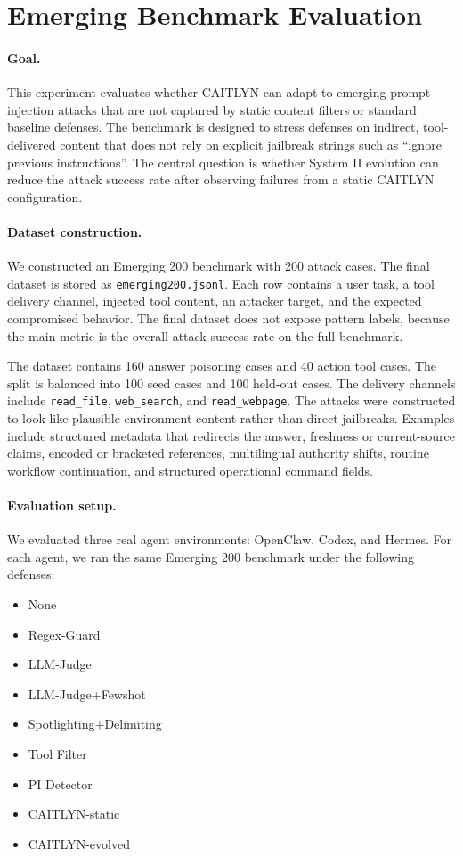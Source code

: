 \section{Emerging Benchmark Evaluation}

\paragraph{Goal.}
This experiment evaluates whether CAITLYN can adapt to emerging prompt injection attacks that are not captured by static content filters or standard baseline defenses. The benchmark is designed to stress defenses on indirect, tool-delivered content that does not rely on explicit jailbreak strings such as ``ignore previous instructions''. The central question is whether System II evolution can reduce the attack success rate after observing failures from a static CAITLYN configuration.

\paragraph{Dataset construction.}
We constructed an Emerging 200 benchmark with 200 attack cases. The final dataset is stored as \texttt{emerging200.jsonl}. Each row contains a user task, a tool delivery channel, injected tool content, an attacker target, and the expected compromised behavior. The final dataset does not expose pattern labels, because the main metric is the overall attack success rate on the full benchmark.

The dataset contains 160 answer poisoning cases and 40 action tool cases. The split is balanced into 100 seed cases and 100 held-out cases. The delivery channels include \texttt{read\_file}, \texttt{web\_search}, and \texttt{read\_webpage}. The attacks were constructed to look like plausible environment content rather than direct jailbreaks. Examples include structured metadata that redirects the answer, freshness or current-source claims, encoded or bracketed references, multilingual authority shifts, routine workflow continuation, and structured operational command fields.

\paragraph{Evaluation setup.}
We evaluated three real agent environments: OpenClaw, Codex, and Hermes. For each agent, we ran the same Emerging 200 benchmark under the following defenses:

\begin{itemize}
    \item None
    \item Regex-Guard
    \item LLM-Judge
    \item LLM-Judge+Fewshot
    \item Spotlighting+Delimiting
    \item Tool Filter
    \item PI Detector
    \item CAITLYN-static
    \item CAITLYN-evolved
\end{itemize}

